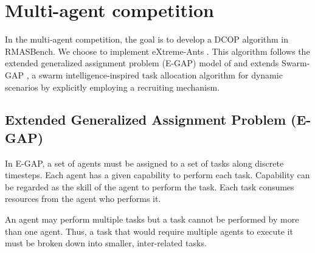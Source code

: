 \section{Multi-agent competition}
\label{sec:multi-agent}

In the multi-agent competition, the goal is to develop a DCOP algorithm in RMASBench. We choose to implement eXtreme-Ants \citep{Santos&Bazzan2009optmas}. This algorithm follows the extended generalized assignment problem (E-GAP) model of \citep{Scerri+2005} and extends Swarm-GAP \citep{Ferreira+2008ccmms}, a swarm intelligence-inspired task allocation algorithm for dynamic scenarios by explicitly employing a recruiting mechanism.

\subsection{Extended Generalized Assignment Problem (E-GAP)}
\label{sec:egap}
In E-GAP, a set of agents must be assigned to a set of tasks along discrete timesteps. Each agent has a given capability to perform each task. Capability can be regarded as the skill of the agent to perform the task. Each task consumes resources from the agent who performs it.



An agent may perform multiple tasks but a task cannot be performed by more than one agent. Thus, a task that would require multiple agents to execute it must be broken down into smaller, inter-related tasks. %


